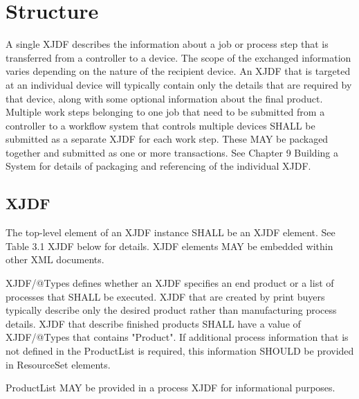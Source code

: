 \chapter{Structure}

A single XJDF describes the information about a job or process step that is transferred from a controller to a device. The scope of the exchanged information varies depending on the nature of the recipient device. An XJDF that is targeted at an individual device will typically contain only the details that are required by that device, along with some optional information about the final product. Multiple work steps belonging to one job that need to be submitted from a controller to a workflow system that controls multiple devices SHALL be submitted as a separate XJDF for each work step. These MAY be packaged together and submitted as one or more transactions. See Chapter 9 Building a System for details of packaging and referencing of the individual XJDF.
 

\section{XJDF}
The top-level element of an XJDF instance SHALL be an XJDF element. See Table 3.1 XJDF below for details. XJDF elements MAY be embedded within other XML documents.

XJDF/@Types defines whether an XJDF specifies an end product or a list of processes that SHALL be executed. XJDF that are created by print buyers typically describe only the desired product rather than manufacturing process details. XJDF that describe finished products SHALL have a value of XJDF/@Types that contains "Product". If additional process information that is not defined in the ProductList is required, this information SHOULD be provided in ResourceSet elements.

ProductList MAY be provided in a process XJDF for informational purposes.

